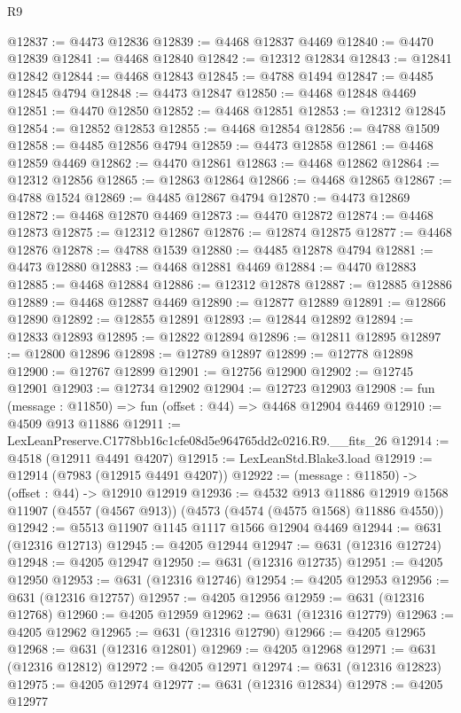 \begin{lexlean}{R9}
\begin{coremodule}
@12837 := @4473 @12836
@12839 := @4468 @12837 @4469
@12840 := @4470 @12839
@12841 := @4468 @12840
@12842 := @12312 @12834
@12843 := @12841 @12842
@12844 := @4468 @12843
@12845 := @4788 @1494
@12847 := @4485 @12845 @4794
@12848 := @4473 @12847
@12850 := @4468 @12848 @4469
@12851 := @4470 @12850
@12852 := @4468 @12851
@12853 := @12312 @12845
@12854 := @12852 @12853
@12855 := @4468 @12854
@12856 := @4788 @1509
@12858 := @4485 @12856 @4794
@12859 := @4473 @12858
@12861 := @4468 @12859 @4469
@12862 := @4470 @12861
@12863 := @4468 @12862
@12864 := @12312 @12856
@12865 := @12863 @12864
@12866 := @4468 @12865
@12867 := @4788 @1524
@12869 := @4485 @12867 @4794
@12870 := @4473 @12869
@12872 := @4468 @12870 @4469
@12873 := @4470 @12872
@12874 := @4468 @12873
@12875 := @12312 @12867
@12876 := @12874 @12875
@12877 := @4468 @12876
@12878 := @4788 @1539
@12880 := @4485 @12878 @4794
@12881 := @4473 @12880
@12883 := @4468 @12881 @4469
@12884 := @4470 @12883
@12885 := @4468 @12884
@12886 := @12312 @12878
@12887 := @12885 @12886
@12889 := @4468 @12887 @4469
@12890 := @12877 @12889
@12891 := @12866 @12890
@12892 := @12855 @12891
@12893 := @12844 @12892
@12894 := @12833 @12893
@12895 := @12822 @12894
@12896 := @12811 @12895
@12897 := @12800 @12896
@12898 := @12789 @12897
@12899 := @12778 @12898
@12900 := @12767 @12899
@12901 := @12756 @12900
@12902 := @12745 @12901
@12903 := @12734 @12902
@12904 := @12723 @12903
@12908 := fun (message : @11850) => fun (offset : @44) => @4468 @12904 @4469
@12910 := @4509 @913 @11886
@12911 := LexLeanPreserve.C1778bb16c1cfe08d5e964765dd2c0216.R9.__fits_26
@12914 := @4518 (@12911 @4491 @4207)
@12915 := LexLeanStd.Blake3.load
@12919 := @12914 (@7983 (@12915 @4491 @4207))
@12922 := (message : @11850) -> (offset : @44) -> @12910 @12919
@12936 := @4532
    @913
    @11886
    @12919
    @1568
    @11907
    (@4557 (@4567 @913))
    (@4573 (@4574 (@4575 @1568) @11886 @4550))
@12942 := @5513 @11907 @1145 @1117 @1566 @12904 @4469
@12944 := @631 (@12316 @12713)
@12945 := @4205 @12944
@12947 := @631 (@12316 @12724)
@12948 := @4205 @12947
@12950 := @631 (@12316 @12735)
@12951 := @4205 @12950
@12953 := @631 (@12316 @12746)
@12954 := @4205 @12953
@12956 := @631 (@12316 @12757)
@12957 := @4205 @12956
@12959 := @631 (@12316 @12768)
@12960 := @4205 @12959
@12962 := @631 (@12316 @12779)
@12963 := @4205 @12962
@12965 := @631 (@12316 @12790)
@12966 := @4205 @12965
@12968 := @631 (@12316 @12801)
@12969 := @4205 @12968
@12971 := @631 (@12316 @12812)
@12972 := @4205 @12971
@12974 := @631 (@12316 @12823)
@12975 := @4205 @12974
@12977 := @631 (@12316 @12834)
@12978 := @4205 @12977

\end{coremodule}
\end{lexlean}
